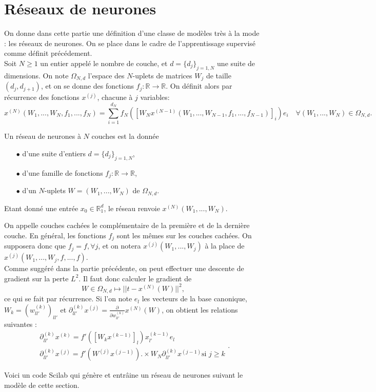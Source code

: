 \section{Réseaux de neurones}

On donne dans cette partie une définition d'une classe de modèles très à la mode : les réseaux de neurones. On se place dans le cadre de l'apprentissage supervisé comme définit précédement.\\

Soit $N\geq 1$ un entier appelé le nombre de couche, et $d=\{d_j\}_{j=1,N}$ une suite de dimensions. On note $\Omega_{N,d}$ l'espace des $N$-uplets de matrices $W_j$ de taille $(d_j,d_{j+1})$, et on se donne des fonctions $f_j : \mathbb R \rightarrow \mathbb R$. On définit alors par récurrence des fonctions $x^{(j)}$, chacune à $j$ variables:
\[x^{(N)}(W_1,...,W_N,f_1,...,f_N) = \sum_{i=1}^{d_N} f_N([W_N x^{(N-1)}(W_1,...,W_{N-1},f_1,...,f_{N-1})]_i)e_i \quad \forall (W_1,...,W_N)\in \Omega_{N,d}. \]

\begin{definition}
Un réseau de neurones à $N$ couches est la donnée
\begin{itemize}
\item[$\bullet$] d'une suite  d'entiers $d=\{d_j\}_{j=1,N}$,
\item[$\bullet$] d'une famille de fonctions $f_j : \mathbb R \rightarrow \mathbb R$,
\item[$\bullet$] d'un $N$-uplets $W=(W_1,...,W_N)$ de $\Omega_{N,d}$.
\end{itemize}
Etant donné une entrée $x_0\in \mathbb R^d_1$, le réseau renvoie $x^{(N)}(W_1,...,W_N)$.
\end{definition}  

On appelle couches cachées le complémentaire de la première et de la dernière couche. En général, les fonctions $f_j$ sont les mêmes sur les couches cachées. On supposera donc que $f_j=f,\forall j$, et on notera $x^{(j)}(W_1,...,W_j)$ à la place de $x^{(j)}(W_1,...,W_j,f,...,f)$.\\

Comme suggéré dans la partie précédente, on peut effectuer une descente de gradient sur la perte $L^2$. Il faut donc calculer le gradient de 
\[W\in\Omega_{N,d} \mapsto ||t - x^{(N)}(W)||^2,\]
ce qui se fait par récurrence. Si l'on note $e_l$ les vecteurs de la base canonique, $W_k=(w_{ll'}^{(k)})_{ll'}$ et $\partial_{ll'}^{(k)}x^{(j)} = \frac{\partial}{\partial w_{ll'}^{(k)}}x^{(N)}(W)$, on obtient les relations suivantes :
\[\begin{array}{c}
\partial_{ll'}^{(k)}x^{(k)}= f'([W_k x^{(k-1)}]_l) x^{(k-1)}_{l'} e_l \\
\partial_{ll'}^{(k)}x^{(j)}= f'(W^{(j)} x^{(j-1)}) .\times W_N \partial_{ll'}^{(k)}x^{(j-1)} \text{si }j\geq k 
\end{array}.\]

Voici un code Scilab qui génère et entrâine un réseau de neurones suivant le modèle de cette section.

